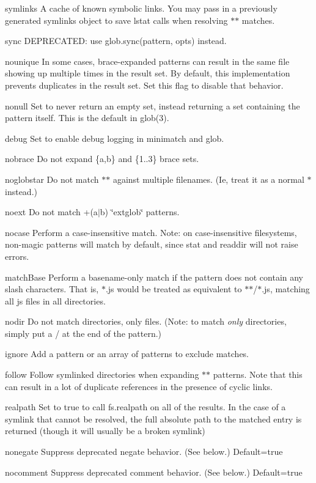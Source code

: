 \begin{DoxyItemize}
\item {\ttfamily symlinks} A cache of known symbolic links. You may pass in a previously generated {\ttfamily symlinks} object to save {\ttfamily lstat} calls when resolving {\ttfamily $\ast$$\ast$} matches.
\item {\ttfamily sync} D\+E\+P\+R\+E\+C\+A\+T\+E\+D\+: use {\ttfamily glob.\+sync(pattern, opts)} instead.
\item {\ttfamily nounique} In some cases, brace-\/expanded patterns can result in the same file showing up multiple times in the result set. By default, this implementation prevents duplicates in the result set. Set this flag to disable that behavior.
\item {\ttfamily nonull} Set to never return an empty set, instead returning a set containing the pattern itself. This is the default in glob(3).
\item {\ttfamily debug} Set to enable debug logging in minimatch and glob.
\item {\ttfamily nobrace} Do not expand {\ttfamily \{a,b\}} and {\ttfamily \{1..3\}} brace sets.
\item {\ttfamily noglobstar} Do not match {\ttfamily $\ast$$\ast$} against multiple filenames. (Ie, treat it as a normal {\ttfamily $\ast$} instead.)
\item {\ttfamily noext} Do not match {\ttfamily +(a$\vert$b)} \char`\"{}extglob\char`\"{} patterns.
\item {\ttfamily nocase} Perform a case-\/insensitive match. Note\+: on case-\/insensitive filesystems, non-\/magic patterns will match by default, since {\ttfamily stat} and {\ttfamily readdir} will not raise errors.
\item {\ttfamily match\+Base} Perform a basename-\/only match if the pattern does not contain any slash characters. That is, {\ttfamily $\ast$.js} would be treated as equivalent to {\ttfamily $\ast$$\ast$/$\ast$.js}, matching all js files in all directories.
\item {\ttfamily nodir} Do not match directories, only files. (Note\+: to match {\itshape only} directories, simply put a {\ttfamily /} at the end of the pattern.)
\item {\ttfamily ignore} Add a pattern or an array of patterns to exclude matches.
\item {\ttfamily follow} Follow symlinked directories when expanding {\ttfamily $\ast$$\ast$} patterns. Note that this can result in a lot of duplicate references in the presence of cyclic links.
\item {\ttfamily realpath} Set to true to call {\ttfamily fs.\+realpath} on all of the results. In the case of a symlink that cannot be resolved, the full absolute path to the matched entry is returned (though it will usually be a broken symlink)
\item {\ttfamily nonegate} Suppress deprecated {\ttfamily negate} behavior. (See below.) Default=true
\item {\ttfamily nocomment} Suppress deprecated {\ttfamily comment} behavior. (See below.) Default=true
\end{DoxyItemize}

